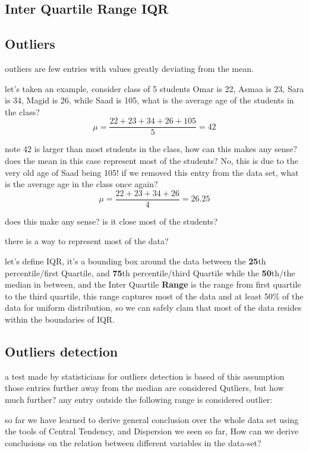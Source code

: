 \documentclass[4apaper,12pt]{book}
\begin{document}
  \subsection{Inter Quartile Range IQR}
  \begin{description}
    \subsection{Outliers}

    \item outliers are few entries with values greatly deviating from the mean.
    \item let's taken an example, consider class of 5 students Omar is 22, Asmaa is 23, Sara is 34, Magid is 26, while Saad is 105, what is the average age of the students in the class?
      \begin{equation} \mu = \frac{22+23+34+26+105}{5}=42 \end{equation}
    \item note 42 is larger than most students in the class, how can this makes any sense? does the mean in this case represent most of the students? No, this is due to the very old age of Saad being 105! if we removed this entry from the data set, what is the average age in the class once again?
      \begin{equation} \mu = \frac{22+23+34+26}{4}=26.25 \end{equation}
    \item does this make any sense? is it close most of the students?

    \item there is a way to represent most of the data?
    \item let's define IQR, it's a bounding box around the data between the \textbf{25}th percentile/first Quartile, and \textbf{75}th percentile/third Quartile  while the \textbf{50}th/the median in between, and the Inter Quartile \textbf{Range} is the range from  first quartile to the third quartile, this range captures most of the data and at least 50\% of the data for uniform distribution, so we can safely clam that most of the data resides within the boundaries of IQR.
      \subsection{Outliers detection}
    \item a test made by statisticians for outliers detection is based of this assumption those entries further away from the median are considered Qutliers, but how much further? any entry outside the following range is considered outlier:
      \begin {equation} [1^{st}Quartile - 1.5*IQR \to 3^{rd} Quartile + 1.5 * IQR ] \end{equation}
    \item so far we have learned to derive general conclusion over the whole data set using the tools of Central Tendency, and Dispersion we seen so far, How can we derive conclusions on the relation between different variables in the data-set?

\end{description}
\end{document}
